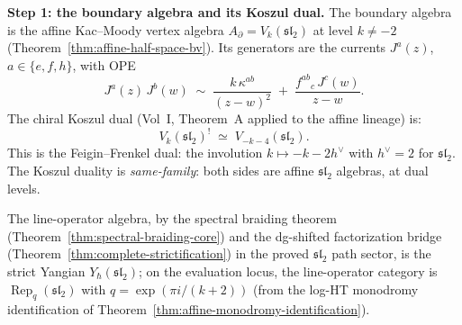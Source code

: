 \begin{construction}
\label{constr:su2-cs-anomaly-completion}

\medskip
\noindent\textbf{Step 1: the boundary algebra and its Koszul dual.}
The boundary algebra is the affine Kac--Moody vertex algebra
$A_\partial = V_k(\mathfrak{sl}_2)$ at level $k\neq -2$
(Theorem~\ref{thm:affine-half-space-bv}). Its generators are the
currents $J^a(z)$, $a\in\{e,f,h\}$, with OPE
\[
J^a(z)\,J^b(w)
\;\sim\;
\frac{k\,\kappa^{ab}}{(z-w)^2}
\;+\;
\frac{f^{ab}{}_c\,J^c(w)}{z-w}.
\]
The chiral Koszul dual (Vol~I, Theorem~A applied to the affine
lineage) is:
\begin{equation}\label{eq:su2-koszul-dual}
V_k(\mathfrak{sl}_2)^!
\;\simeq\;
V_{-k-4}(\mathfrak{sl}_2).
\end{equation}
This is the Feigin--Frenkel dual: the involution $k\mapsto -k-2h^\vee$
with $h^\vee = 2$ for $\mathfrak{sl}_2$. The Koszul duality is
\emph{same-family}: both sides are affine $\mathfrak{sl}_2$ algebras,
at dual levels.

The line-operator algebra, by the spectral braiding theorem
(Theorem~\ref{thm:spectral-braiding-core}) and the dg-shifted
factorization bridge
(Theorem~\ref{thm:complete-strictification}) in the proved
$\mathfrak{sl}_2$ path sector, is the strict Yangian
$Y_\hbar(\mathfrak{sl}_2)$; on the evaluation locus,
the line-operator category is
$\operatorname{Rep}_q(\mathfrak{sl}_2)$ with
$q = \exp(\pi i/(k+2))$ (from the log-HT monodromy identification
of Theorem~\ref{thm:affine-monodromy-identification}).


\end{construction}
